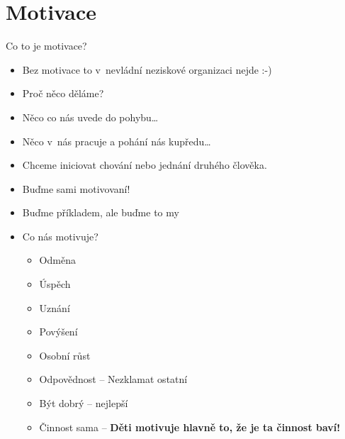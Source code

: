 \documentclass[compress,utf8,xcolor=dvipsnames]{beamer}
\begin{document}
\section{Motivace}

\begin{frame}{Co to je motivace?}
\begin{multicols}{2}
\begin{itemize}
\item Bez motivace to v~nevládní neziskové organizaci nejde :-)
\item Proč něco děláme?
\item Něco co nás uvede do pohybu\ldots
\item Něco v~nás pracuje a pohání nás kupředu\ldots
\item Chceme iniciovat chování nebo jednání druhého člověka.
\item Buďme sami motivovaní!
\item Buďme příkladem, ale buďme to my
\end{itemize}
\columnbreak
\begin{itemize}
\item Co nás motivuje?
 \begin{itemize}
 \item Odměna
 \item Úspěch
 \item Uznání
 \item Povýšení
 \item Osobní růst
 \item Odpovědnost -- Nezklamat ostatní
 \item Být dobrý -- nejlepší
 \item Činnost sama -- \textbf{Děti motivuje hlavně to, že je ta činnost baví!}
 \end{itemize}
\end{itemize}
\end{multicols}
\end{frame}
\end{document}
